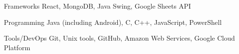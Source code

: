 

\begin{cvskills}

  \cvskill
    {Frameworks} %
    {React, MongoDB, Java Swing, Google Sheets API} %

  \cvskill
    {Programming} %
    {Java (including Android), C, C++, JavaScript, PowerShell} %
    
  \cvskill
    {Tools/DevOps} %
    {Git, Unix tools, GitHub, Amazon Web Services, Google Cloud Platform} %

\end{cvskills}
